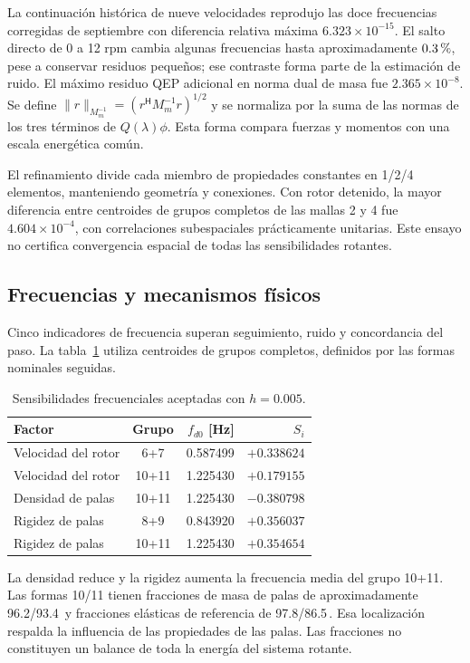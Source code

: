 La continuación histórica de nueve velocidades reprodujo las doce frecuencias corregidas de septiembre con diferencia relativa máxima $6.323\times10^{-15}$. El salto directo de 0 a 12 rpm cambia algunas frecuencias hasta aproximadamente $0.3\,\text{\char37}$, pese a conservar residuos pequeños; ese contraste forma parte de la estimación de ruido. El máximo residuo QEP adicional en norma dual de masa fue $2.365\times10^{-8}$. Se define $\|r\|_{M_m^{-1}}=(r^{\mathsf H}M_m^{-1}r)^{1/2}$ y se normaliza por la suma de las normas de los tres términos de $Q(\lambda)\phi$. Esta forma compara fuerzas y momentos con una escala energética común.

El refinamiento divide cada miembro de propiedades constantes en 1/2/4 elementos, manteniendo geometría y conexiones. Con rotor detenido, la mayor diferencia entre centroides de grupos completos de las mallas 2 y 4 fue $4.604\times10^{-4}$, con correlaciones subespaciales prácticamente unitarias. Este ensayo no certifica convergencia espacial de todas las sensibilidades rotantes.

\subsection{Frecuencias y mecanismos físicos}
Cinco indicadores de frecuencia superan seguimiento, ruido y concordancia del paso. La tabla~\ref{tab:freq} utiliza centroides de grupos completos, definidos por las formas nominales seguidas.

\begin{table}[htbp]
\centering
\caption{Sensibilidades frecuenciales aceptadas con $h=0.005$.}\label{tab:freq}
\begin{tabular}{lcrr}
\toprule
Factor & Grupo & $f_{d0}$ [Hz] & $S_i$\\
\midrule
Velocidad del rotor & 6+7 & 0.587499 & $+0.338624$\\
Velocidad del rotor & 10+11 & 1.225430 & $+0.179155$\\
Densidad de palas & 10+11 & 1.225430 & $-0.380798$\\
Rigidez de palas & 8+9 & 0.843920 & $+0.356037$\\
Rigidez de palas & 10+11 & 1.225430 & $+0.354654$\\
\bottomrule
\end{tabular}
\end{table}

La densidad reduce y la rigidez aumenta la frecuencia media del grupo 10+11. Las formas 10/11 tienen fracciones de masa de palas de aproximadamente 96.2/93.4\, y fracciones elásticas de referencia de 97.8/86.5\,. Esa localización respalda la influencia de las propiedades de las palas. Las fracciones no constituyen un balance de toda la energía del sistema rotante.

